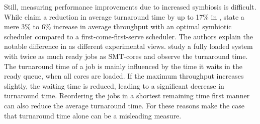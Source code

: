 \begin{comment}
In \citeyear{snavely_symbiotic_2002} \citeauthor{snavely_symbiotic_2002}
discussed the topic of priorities in symbiotic schedules.
In their earlier work (\cite{snavely_symbiotic_2000}) they assumed same
priority jobs.
Now, they present two meanings for priority: ``(A) guarantee a fraction of
machine proportional to priority'' or ``(B) guarantee a fraction of
single-threaded performance proportional to priority''
(\autocite[70]{snavely_symbiotic_2002}).
The authors base their priority mechanisms on two values: SOLOFRAC and CS.
SOLOFRAC is the, from the priority derived fraction of the CPU time,
a job needs to be scheduled alone and CS is the fraction of the CPU time,
where no job is solo scheduled.

The 'Naive' priority mechanism schedules a job alone for its SOLOFRAC
share and co-schedules for CS cycles. Behind this stand two assumptions: first,
during co-scheduling each job is an equal share of the cycles assigned.
And second, the number of jobs does not exceed the number of \gls{smt}-cores.

The proposed 'Symb' mechanism on the other hand, can handle more jobs
than available \gls{smt}-cores and observes job behaviour. By running jobs
solo, 'Symb' determines the job's ``'natural' IPC''
(\autocite[71]{snavely_symbiotic_2002})
and then evaluates the job's performance during a phase of co-scheduling.
Based on this measurement, the SOLOFRAC portion is reduced such that the job get its
rightful share of cycles. The increase in co-scheduling time leads to increased
utilization of the system.

Other presented approaches in \cite{snavely_symbiotic_2002} require hardware
changes and are therefore out of scope.
\\
\end{comment}

Still, measuring performance improvements due to increased symbiosis is
difficult.
While \citeauthor{snavely_symbiotic_2000} claim a reduction in average
turnaround time by up to 17\% in \cite{snavely_symbiotic_2000},
\citeauthor{eyerman_revisiting_2015} state a mere 3\% to 6\% increase in
average throughput with an optimal symbiotic scheduler compared to a
first-come-first-serve scheduler.
The authors explain the notable difference in \cite{eyerman_revisiting_2015} as
different experimental views.
\citeauthor{snavely_symbiotic_2000} study a fully loaded system with twice
as much ready jobs as SMT-cores and observe the turnaround time.
The turnaround time of a job is mainly influenced by the time it waits in the
ready queue, when all cores are loaded.
If the maximum throughput increases slightly, the waiting time is reduced,
leading to a significant decrease in turnaround time.
Reordering the jobs in a shortest remaining time first manner can also
reduce the average turnaround time.
For these reasons \citeauthor{eyerman_revisiting_2015} make the case
that turnaround time alone can be a misleading measure.

